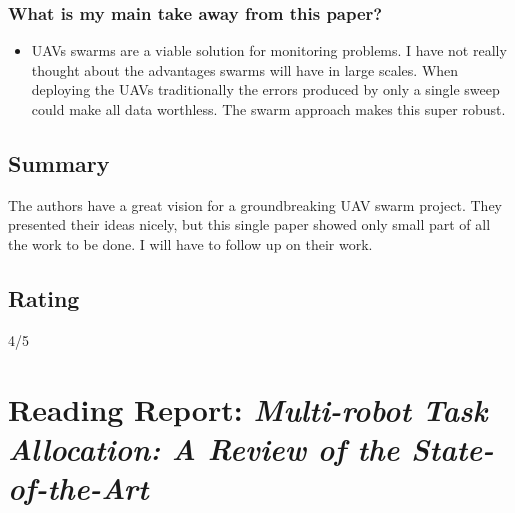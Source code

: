     \subsubsection*{What is my main take away from this paper?}
    \begin{itemize}
        \item UAVs swarms are a viable solution for monitoring problems. I have not really thought about the advantages swarms will have in large scales. When deploying the UAVs traditionally the errors produced by only a single sweep could make all data worthless. The swarm approach makes this super robust.
    \end{itemize}
    
    \subsection*{Summary}
    The authors have a great vision for a groundbreaking UAV swarm project. They presented their ideas nicely, but this single paper showed only small part of all the work to be done. I will have to follow up on their work.
    
    \subsection*{Rating}
    4/5
    
    \newpage
    
    \section{Reading Report: \emph{Multi-robot Task Allocation: A Review of the State-of-the-Art}}
    \cite{Khamis2015}
    
